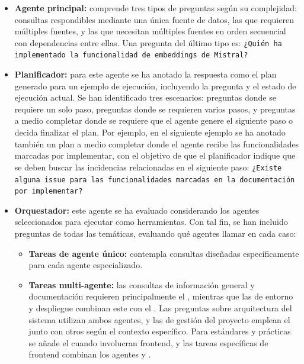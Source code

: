 \begin{itemize}
  \item\textbf{Agente principal: }comprende tres tipos de preguntas según su complejidad: consultas respondibles mediante una única fuente de datos, las que requieren múltiples fuentes, y las que necesitan múltiples fuentes en orden secuencial con dependencias entre ellas. Una pregunta del último tipo es: \texttt{¿Quién ha implementado la funcionalidad de embeddings de Mistral?} 

  \item\textbf{Planificador: }para este agente se ha anotado la respuesta como el plan generado para un ejemplo de ejecución, incluyendo la pregunta y el estado de ejecución actual. Se han identificado tres escenarios: preguntas donde se requiere un solo paso, preguntas donde se requieren varios pasos, y preguntas a medio completar donde se requiere que el agente genere el siguiente paso o decida finalizar el plan. Por ejemplo, en el siguiente ejemplo se ha anotado también un plan a medio completar donde el agente recibe las funcionalidades marcadas por implementar, con el objetivo de que el planificador indique que se deben buscar las incidencias relacionadas en el siguiente paso: \texttt{¿Existe alguna issue para las funcionalidades marcadas en la documentación por implementar?} 
\item\textbf{Orquestador: }este agente se ha evaluado considerando los agentes seleccionados para ejecutar como herramientas. Con tal fin, se han incluido preguntas de todas las temáticas, evaluando qué agentes llamar en cada caso:

\begin{itemize}
\item \textbf{Tareas de agente único: }contempla consultas diseñadas específicamente para cada agente especializado.

\item \textbf{Tareas multi-agente:} las consultas de información general y documentación requieren principalmente el , mientras que las de entorno y despliegue combinan este con el . Las preguntas sobre arquitectura del sistema utilizan ambos agentes, y las de gestión del proyecto emplean el  junto con otros según el contexto específico. Para estándares y prácticas se añade el  cuando involucran frontend, y las tareas específicas de frontend combinan los agentes  y .


\end{itemize}
\end{itemize}
